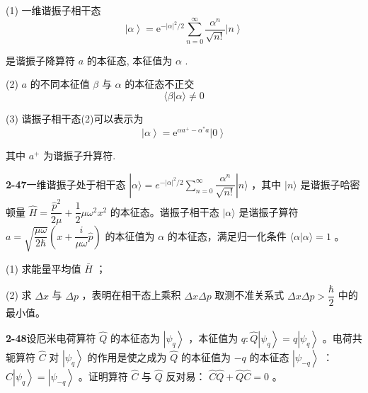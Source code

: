 (1) 一维谐振子相干态
\begin{equation}\tag{2}
\left| \alpha \right\rangle = \mathrm{e} ^ {- \left| \alpha \right| ^ {2} / 2} \sum_ {n = 0} ^ {\infty} \dfrac {\alpha^ {n}}{\sqrt {n !}} \left| n \right\rangle
\end{equation}

是谐振子降算符 $\displaystyle a$ 的本征态, 本征值为 $\displaystyle \alpha$ .

(2) $\displaystyle a$ 的不同本征值 $\displaystyle \beta$ 与 $\displaystyle \alpha$ 的本征态不正交
\begin{equation}\tag{3}
\langle \beta | \alpha \rangle \neq 0
\end{equation}

(3) 谐振子相干态(2)可以表示为
\begin{equation}\tag{4}
\left| \alpha \right\rangle = \mathrm{e} ^ {\alpha a ^ {+} - \alpha^ {*} a} \left| 0 \right\rangle
\end{equation}

其中 $\displaystyle a^{+}$ 为谐振子升算符.

\vfill

\newpage

\textbf{2-47}\quad 一维谐振子处于相干态 $\displaystyle |\alpha\rangle = e^{-|\alpha|^2 / 2}\sum_{n=0}^{\infty} \dfrac{\alpha^n}{\sqrt{n!}} |n\rangle$ ，其中 $\displaystyle |n\rangle$ 是谐振子哈密顿量 $\displaystyle \hat{H} = \dfrac{\hat{p}^2}{2\mu} + \dfrac{1}{2}\mu \omega^2 x^2$ 的本征态。谐振子相干态 $\displaystyle |\alpha\rangle$ 是谐振子算符 $\displaystyle a = \sqrt{\dfrac{\mu \omega}{2\hbar}} \left(x + \dfrac{i}{\mu \omega} \hat{p}\right)$ 的本征值为 $\displaystyle \alpha$ 的本征态，满足归一化条件 $\displaystyle \langle \alpha | \alpha \rangle = 1$ 。

(1) 求能量平均值 $\displaystyle \bar{H}$ ；

(2) 求 $\displaystyle \Delta x$ 与 $\displaystyle \Delta p$ ，表明在相干态上乘积 $\displaystyle \Delta x \Delta p$ 取测不准关系式 $\displaystyle \Delta x \Delta p > \dfrac{\hbar}{2}$ 中的最小值。

\vfill

\newpage

\textbf{2-48}\quad 设厄米电荷算符 $\displaystyle \hat{Q}$ 的本征态为 $\displaystyle \left|\psi_q\right\rangle$ ，本征值为 $\displaystyle q: \hat{Q} \left|\psi_q\right\rangle = q \left|\psi_q\right\rangle$ 。电荷共轭算符 $\displaystyle \hat{C}$ 对 $\displaystyle \left|\psi_q\right\rangle$ 的作用是使之成为 $\displaystyle \hat{Q}$ 的本征值为 $\displaystyle -q$ 的本征态 $\displaystyle \left|\psi_{-q}\right\rangle$ ： $\displaystyle \hat{C} \left|\psi_q\right\rangle = \left|\psi_{-q}\right\rangle$ 。证明算符 $\displaystyle \hat{C}$ 与 $\displaystyle \hat{Q}$ 反对易： $\displaystyle \hat{C}\hat{Q} + \hat{Q}\hat{C} = 0$ 。

\vfill

\newpage

